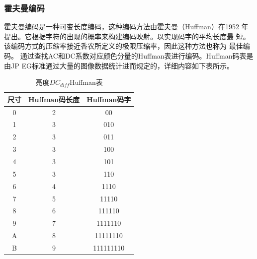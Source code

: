 \documentclass{article}
\numberwithin {equation}{section}
\begin{document}
\begin{spacing}{1.25}
    \subsubsection{霍夫曼编码}
      \vspace{1em}
      霍夫曼编码是一种可变长度编码，这种编码方法由霍夫曼（Huffman）在1952
      年提出。它根据字符的出现的概率来构建编码映射。以实现码字的平均长度最
      短。该编码方式的压缩率接近香农所定义的极限压缩率，因此这种方法也称为
      最佳编码。
      通过查找AC和DC系数对应颜色分量的Huffman表进行编码。Huffman码表是由JP
      EG标准通过大量的图像数据统计进而规定的，详细内容如下表所示。
      \begin{table}[H]
        \centering
        \caption{亮度$DC_{diff}$Huffman表}
        \begin{tabular}{ccc}
          \toprule
          尺寸  & Huffman码长度 & Huffman码字\\
          \midrule
          0     & 2             & 00\\
          1     & 3             & 010\\
          2     & 3             & 011\\
          3     & 3             & 100\\
          4     & 3             & 101\\
          5     & 3             & 110\\
          6     & 4             & 1110\\
          7     & 5             & 11110\\
          8     & 6             & 111110\\
          9     & 7             & 1111110\\
          A     & 8             & 11111110\\
          B     & 9             & 111111110\\
          \bottomrule
        \end{tabular}
      \end{table}


\end{spacing}
\end{document}
